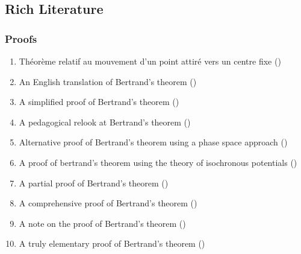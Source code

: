 \subsection{Rich Literature}
\begin{frame}\frametitle{Proofs}
\begin{enumerate}
	\item Th\'{e}or\`{e}me relatif au mouvement d’un point attir\'{e} vers un centre fixe ()
	\item An English translation of Bertrand's theorem ()
	\item A simplified proof of Bertrand's theorem ()
	\item A pedagogical relook at Bertrand's theorem ()
	\item Alternative proof of Bertrand's theorem using a phase space approach ()
	\item A proof of bertrand’s theorem using the theory of isochronous potentials ()
	\item A partial proof of Bertrand's theorem ()
	\item A comprehensive proof of Bertrand's theorem ()
	\item A note on the proof of Bertrand's theorem ()
	\item A truly elementary proof of Bertrand's theorem ()
\end{enumerate}
\end{frame}


\endinput  %

